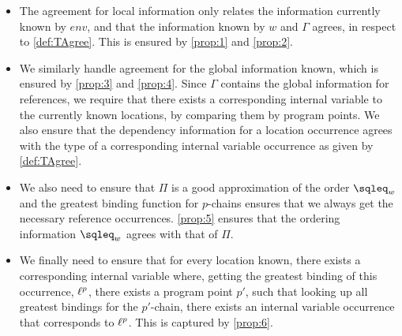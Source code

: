 \documentclass{eptcs}
\begin{document}

\begin{itemize}
	\item The agreement for local information only relates the information currently known by $env$, and that the information known by $w$ and $\Gamma$ agrees, in respect to \cref{def:TAgree}.
		This is ensured by \eqref{prop:1} and \eqref{prop:2}.

	\item We similarly handle agreement for the global information
          known, which is ensured by \eqref{prop:3} and
          \eqref{prop:4}. 
		Since $\Gamma$ contains the global information for
                references, we require that there exists a
                corresponding internal variable to the currently known
                locations, by comparing them by program points. 
		We also ensure that the dependency information for a location
                occurrence agrees with the type of a corresponding
                internal variable occurrence as given by \cref{def:TAgree}. 

	\item We also need to ensure that $\Pi$ is a good
          approximation of the order $\sqleq_w$ and the greatest
          binding function for $p$-chains ensures that we always get
          the necessary reference occurrences. 
	\eqref{prop:5} ensures that the ordering information
        $\sqleq_w$ agrees with that of $\Pi$.

   \item We finally need to ensure that for every location
        known, there exists a corresponding internal variable
        where, getting the greatest binding of this occurrence,
        $\ell^p$, there exists a program point $p'$, such that
        looking up all greatest bindings for the $p'$-chain, there
        exists an internal variable occurrence that corresponds to
        $\ell^p$. This is captured by \eqref{prop:6}.
\end{itemize}
\end{document}
